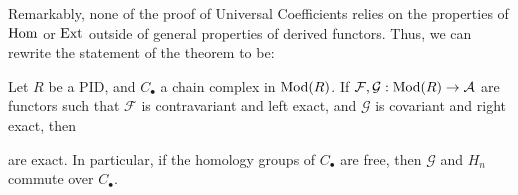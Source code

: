Remarkably, none of the proof of Universal Coefficients relies on the properties of $\operatorname{Hom}$ or $\operatorname{Ext}$ outside of general properties of derived functors. Thus, we can rewrite the statement of the theorem to be:

\begin{theorem}
    Let $R$ be a PID, and $C_\bullet$ a chain complex in $\operatorname{Mod}(R)$. If $\mathcal{F}, \mathcal{G} : \operatorname{Mod}(R) \to \mathcal{A}$ are functors such that $\mathcal{F}$ is contravariant and left exact, and $\mathcal{G}$ is covariant and right exact, then
    \begin{center}
    \end{center}
    are exact. In particular, if the homology groups of $C_\bullet$ are free, then $\mathcal{G}$ and $H_n$ commute over $C_\bullet$.
\end{theorem}

\iffalse
\begin{theorem}
Suppose $p$ is a prime which satisfies $p \equiv 4 \pmod{4}$. Then, there is no integer $n$ for which $p$ divides $n^2 + 1$.

    \begin{proof}
        Note that $(p-1)/2$ is odd, as by assumption, $(p-1)/2 \equiv 1 \pmod{4}$. Assume that that there existed such an $n$ where $p$ divides $n^2 + 1$. By basic modular arithmetic, $n^2 \equiv -1 \pmod{p}$. So,
        \[
            (n^2)^{(p-1)/2} = (n^2)^k \equiv -1 \pmod{p}
        \]
        as $k$ odd. However, by Fermat's little theorem, $(n^2)^{(p-1)/2} = n^{p-1} \equiv 1 \pmod{p}$. Now, $1 \equiv -1 \pmod{p}$ is impossible as $p \equiv 3 \pmod{4}$. So, such $n$ cannot exist.
    \end{proof}
\end{theorem}
\fi


